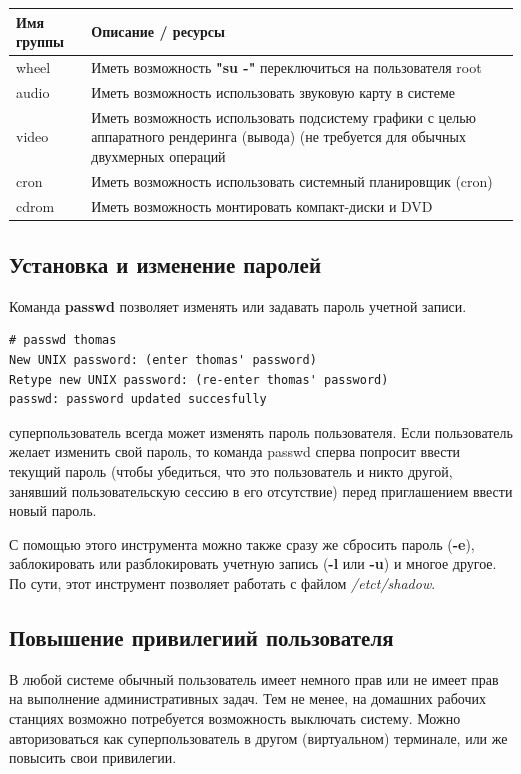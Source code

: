 \documentclass[10pt]{book}
\begin{document}
\begin{tabular}{|p{7cm}|p{7cm}|}
\hline
\textbf{Имя группы} & \textbf{Описание / ресурсы} \\
\hline
wheel & Иметь возможность \textbf{"su -"} переключиться на пользователя root \\ \hline
audio & Иметь возможность использовать звуковую карту в системе \\ \hline
video & Иметь возможность использовать подсистему графики с целью аппаратного рендеринга (вывода) (не требуется для обычных двухмерных операций \\ \hline
cron & Иметь возможность использовать системный планировщик (cron) \\ 
cdrom & Иметь возможность монтировать компакт-диски и DVD \\ 
\hline
\end{tabular}

\subsection{Установка и изменение паролей}
Команда \textbf{passwd} позволяет изменять или задавать пароль учетной записи.
\begin{tcolorbox}
\begin{lstlisting}
# passwd thomas
New UNIX password: (enter thomas' password)
Retype new UNIX password: (re-enter thomas' password)
passwd: password updated succesfully
\end{lstlisting}
\end{tcolorbox}

суперпользователь всегда может изменять пароль пользователя. Если пользователь желает изменить свой пароль, то команда passwd сперва попросит ввести текущий пароль (чтобы убедиться, что это пользователь и никто другой, занявший пользовательскую сессию в его отсутствие) перед приглашением ввести новый пароль.

С помощью этого инструмента можно также сразу же сбросить пароль (\textbf{-e}), заблокировать или разблокировать учетную запись (\textbf{-l} или \textbf{-u}) и многое другое. По сути, этот инструмент позволяет работать с файлом \textit{/etct/shadow}.

\subsection{Повышение привилегиий пользователя}

В любой системе обычный пользователь имеет немного прав или не имеет прав на выполнение административных задач. Тем не менее, на домашних рабочих станциях возможно потребуется возможность выключать систему. Можно авторизоваться как суперпользователь в другом (виртуальном) терминале, или же повысить свои привилегии. 
\end{document}
